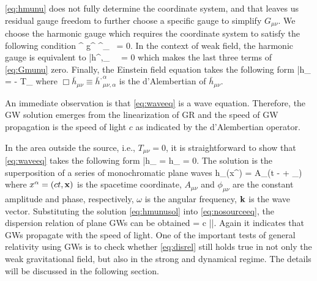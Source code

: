 \cref{eq:hmunu} does not fully determine the coordinate system, and that leaves us residual gauge freedom to further choose a specific gauge to simplify $G_{\mu\nu}$.
We choose the harmonic gauge which requires the coordinate system to satisfy the following condition
\be
\Gamma^{\lambda} \equiv g^{\mu\nu} \Gamma^{\lambda}_{~\mu\nu} = 0.
\ee
In the context of weak field, the harmonic gauge is equivalent to
\be 
\bar{h}^{,\alpha}_{~~\mu\alpha} = 0
\ee
which makes the last three terms of \cref{eq:Gmunu} zero.
Finally, the Einstein field equation takes the following form 
\be\label{eq:waveeq}
\Box \bar{h}_{\mu\nu} = - T_{\mu\nu}
\ee
where $\Box \bar{h}_{\mu\nu} \equiv \bar{h}^{,\alpha}_{~~\mu\nu,\alpha}$ is the d'Alembertian of $\bar{h}_{\mu\nu}$.

An immediate observation is that \cref{eq:waveeq} is a wave equation.
Therefore, the \ac{GW} solution emerges from the linearization of \ac{GR} and the speed of \ac{GW} propagation is the speed of light $c$ as indicated by the d'Alembertian operator.

In the area outside the source, i.e., $T_{\mu\nu} = 0$, it is straightforward to show that \cref{eq:waveeq} takes the following form
\be\label{eq:nosourceeq}
\Box \bar{h}_{\mu\nu} = \Box h_{\mu\nu} = 0. 
\ee
The solution is the superposition of a series of monochromatic plane waves
\be\label{eq:hmunusol}
{h}_{\mu\nu}(x^\alpha) = A_{\mu\nu}\cos(\omega t - \cdot{} + \phi_{\mu\nu}) 
\ee
where $x^\alpha = (ct, \bold{x})$ is the spacetime coordinate, $A_{\mu\nu}$ and $\phi_{\mu\nu}$ are the constant amplitude and phase, respectively, $\omega$ is the angular frequency, $\bold{k}$ is the wave vector. Substituting the solution \cref{eq:hmunusol} into \cref{eq:nosourceeq}, the dispersion relation of plane \acp{GW} can be obtained 
\be\label{eq:disrel}
\omega = c ||.
\ee
Again it indicates that \acp{GW} propagate with the speed of light.
One of the important tests of general relativity using \acp{GW} is to check whether \cref{eq:disrel} still holds true in not only the weak gravitational field, but also in the strong and dynamical regime. 
The details will be discussed in the following section.

